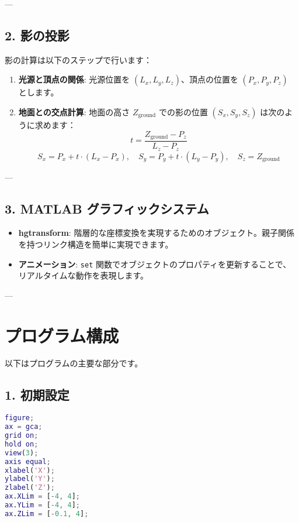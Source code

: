 \documentclass[a4paper,12pt]{article}
\begin{document}
---

\subsection*{2. 影の投影}
影の計算は以下のステップで行います：
\begin{enumerate}
    \item \textbf{光源と頂点の関係}:
    光源位置を \((L_x, L_y, L_z)\)、頂点の位置を \((P_x, P_y, P_z)\) とします。
    \item \textbf{地面との交点計算}:
    地面の高さ \(Z_{\text{ground}}\) での影の位置 \((S_x, S_y, S_z)\) は次のように求めます：
    \[
    t = \frac{Z_{\text{ground}} - P_z}{L_z - P_z}
    \]
    \[
    S_x = P_x + t \cdot (L_x - P_x), \quad S_y = P_y + t \cdot (L_y - P_y), \quad S_z = Z_{\text{ground}}
    \]
\end{enumerate}

---

\subsection*{3. MATLAB グラフィックシステム}
\begin{itemize}
    \item \textbf{hgtransform}:
    階層的な座標変換を実現するためのオブジェクト。親子関係を持つリンク構造を簡単に実現できます。
    \item \textbf{アニメーション}:
    \texttt{set} 関数でオブジェクトのプロパティを更新することで、リアルタイムな動作を表現します。
\end{itemize}

---

\section*{プログラム構成}
以下はプログラムの主要な部分です。

\subsection*{1. 初期設定}
\begin{lstlisting}[language=Matlab]
figure;
ax = gca;
grid on;
hold on;
view(3);
axis equal;
xlabel('X');
ylabel('Y');
zlabel('Z');
ax.XLim = [-4, 4];
ax.YLim = [-4, 4];
ax.ZLim = [-0.1, 4];
\end{lstlisting}
\end{document}
